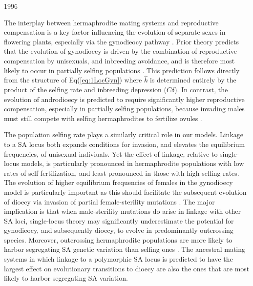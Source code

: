 1996\documentclass[9pt,twocolumn,twoside,lineno]{gsajnl}
\begin{document}
The interplay between hermaphrodite mating systems and reproductive compensation is a key factor influencing the evolution of separate sexes in flowering plants, especially via the gynodieocy pathway \citep{Darwin1877,Charlesworth1978a}. Prior theory predicts that the evolution of gynodioecy is driven by the combination of reproductive compensation by unisexuals, and inbreeding avoidance, and is therefore most likely to occur in partially selfing populations \citep{Lewis1942,Lloyd1975,Charlesworth1978a,KaferPannell2017}. This prediction follows directly from the structure of Eq(\ref{eq:1LocGyn}) where $\hat{k}$ is determined entirely by the product of the selfing rate and inbreeding depression ($C \delta$). In contrast, the evolution of androdioecy is predicted to require significantly higher reproductive compensation, especially in partially selfing populations, because invading males must still compete with selfing hermaphrodites to fertilize ovules \citep{Charlesworth1978b,KaferPannell2017}. 

The population selfing rate plays a similarly critical role in our models. Linkage to a SA locus both expands conditions for invasion, and elevates the equilibrium frequencies, of unisexual indiviuals. Yet the effect of linkage, relative to single-locus models, is particularly pronounced in hermaphrodite populations with low rates of self-fertilization, and least pronounced in those with high selfing rates. The evolution of higher equilibrium frequencies of females in the gynodioecy model is particularly important as this should facilitate the subsequent evolution of dioecy via invasion of partial female-sterility mutations \citep{Charlesworth1978a,Charlesworth1978b,Charlesworth1999,Charlesworth2006}. The major implication is that when male-sterility mutations do arise in linkage with other SA loci, single-locus theory may significantly underestimate the potential for gynodieocy, and subsequently dioecy, to evolve in predominantly outcrossing species. Moreover, outcrossing hermaphrodite populations are more likely to harbor segregating SA genetic variation than selfing ones \citep{JordanConnallon2014,Olito2016}. The ancestral mating systems in which linkage to a polymorphic SA locus is predicted to have the largest effect on evolutionary transitions to dioecy are also the ones that are most likely to harbor segregating SA variation. 
\end{document}
